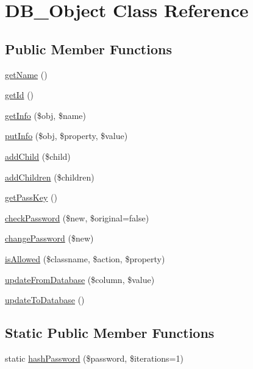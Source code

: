 \hypertarget{classDB__Object}{
\section{DB\_\-Object Class Reference}
\label{dc/d6d/classDB__Object}
}
\subsection*{Public Member Functions}
\begin{DoxyCompactItemize}
\item 
\hyperlink{classDB__Object_a9e72ad4e667d0de2f3d2df0cc37c6463}{getName} ()
\item 
\hyperlink{classDB__Object_ae09675ff1d492c3571766142196556df}{getId} ()
\item 
\hyperlink{classDB__Object_a45d1bd94aa7a815efa455c79742a3aff}{getInfo} (\$obj, \$name)
\item 
\hyperlink{classDB__Object_a96ce58f2dd8e64902dbd72a072083a0c}{putInfo} (\$obj, \$property, \$value)
\item 
\hyperlink{classDB__Object_aee226b738dafa7018cd39cc66a0d8665}{addChild} (\$child)
\item 
\hyperlink{classDB__Object_aab1bdf6fa7b550f96f21292aa53bb052}{addChildren} (\$children)
\item 
\hyperlink{classDB__Object_a2c2b7b97b2c73bee8d6d616fb51e297e}{getPassKey} ()
\item 
\hyperlink{classDB__Object_a8bd5723454893098af658c007c93a7c5}{checkPassword} (\$new, \$original=false)
\item 
\hyperlink{classDB__Object_a07519cd100d61b0985073f410f6456dd}{changePassword} (\$new)
\item 
\hyperlink{classDB__Object_ad323cdf42e524a6dccb1460c26d1a682}{isAllowed} (\$classname, \$action, \$property)
\item 
\hyperlink{classDB__Object_acde3675787ca522413a21203a3957148}{updateFromDatabase} (\$column, \$value)
\item 
\hyperlink{classDB__Object_afd22a626921cf089ccf1977a652d6fc1}{updateToDatabase} ()
\end{DoxyCompactItemize}
\subsection*{Static Public Member Functions}
\begin{DoxyCompactItemize}
\item 
static \hyperlink{classDB__Object_a8438909f696e1bb56d19eb617ef3f648}{hashPassword} (\$password, \$iterations=1)
\end{DoxyCompactItemize}
